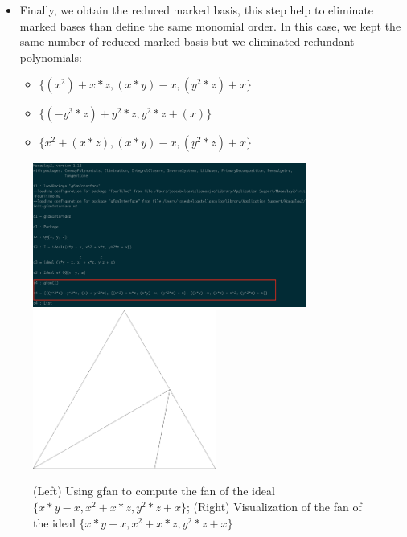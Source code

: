 \begin{example}
\begin{itemize}
  \item Finally, we obtain the reduced marked \grob basis, this step help
    to eliminate marked \grob bases than define the same monomial order.
    In this case, we kept the same number of reduced marked \grob basis
    but we eliminated redundant polynomials:

    \begin{itemize}
    \item $\{(x^2) + x*z, (x*y) - x, (y^2*z) + x\}$ 
    \item $\{(-y^3*z) + y^2*z, y^2*z + (x)\}$  
    \item $\{x^2 + (x*z), (x*y) - x, (y^2*z) + x\}$
    \end{itemize}
  \end{itemize}
  
  \begin{figure}[h]
    \centering
    \includegraphics[width=9cm]{gfanIdeal3}
    \includegraphics[width=6cm]{ideal3}
    \caption{(Left) Using gfan to compute the \grob fan of the ideal
      $\{x*y - x, x^2 + x*z, y^2*z + x\}$; (Right) Visualization of the \grob
    fan of the ideal $\{x*y - x, x^2 + x*z, y^2*z + x\}$}
  \end{figure}
\end{example}

